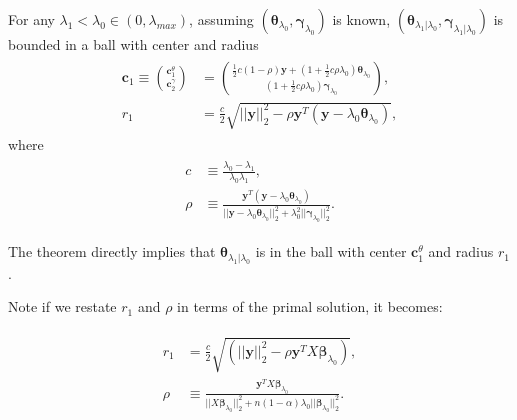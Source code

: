 \begin{theorem}
    \label{thm:1.1.alt}
    For any $\lambda_1<\lambda_{0}\in (0,\lambda_{max})$, assuming $(\boldsymbol\theta_{\lambda_0},\boldsymbol\gamma_{\lambda_0})$ is known, $(\boldsymbol\theta_{\lambda_1|\lambda_0},\boldsymbol\gamma_{\lambda_1|\lambda_0})$ is bounded in a ball with center and radius
    \begin{gather}
        \begin{aligned}
            \boldsymbol c_1\equiv\binom{\boldsymbol c_1^\theta}{\boldsymbol c_2^\gamma}&=\binom{\frac{1}{2}c(1-\rho)\boldsymbol y+(1+\frac{1}{2}c\rho\lambda_0)\boldsymbol\theta_{\lambda_0}}{(1+\frac{1}{2}c\rho\lambda_0)\boldsymbol\gamma_{\lambda_0}},\\
            r_1&=\frac{c}{2}\sqrt{||\boldsymbol y||_2^2-\rho \boldsymbol y^T(\boldsymbol y-\lambda_0\boldsymbol\theta_{\lambda_0})},
        \end{aligned}
    \end{gather}
    where
    \begin{gather}
        \begin{aligned}
            c&\equiv\frac{\lambda_0-\lambda_1}{\lambda_0\lambda_1},\\
            \rho&\equiv\frac{\boldsymbol y^T(\boldsymbol y-\lambda_0\boldsymbol\theta_{\lambda_0})}{||\boldsymbol y-\lambda_0\boldsymbol\theta_{\lambda_0}||_2^2+\lambda_0^2||\boldsymbol\gamma_{\lambda_0}||_2^2}.\nonumber
        \end{aligned}
    \end{gather}
\end{theorem}

The theorem  directly implies that $\boldsymbol\theta_{\lambda_1|\lambda_0}$ is in the ball with center $\boldsymbol c_1^\theta$ and radius $r_1$.

Note if we restate $r_1$ and $\rho$ in terms of the primal solution, it becomes:

\begin{gather}
    \label{eq:thm1prim}
    \begin{aligned}
        r_1&=\frac{c}{2}\sqrt{(||\boldsymbol y||_2^2-\rho \boldsymbol y^TX\boldsymbol\beta_{\lambda_0})},\\
        \rho&\equiv\frac{\boldsymbol y^TX\boldsymbol\beta_{\lambda_0}}{||X\boldsymbol\beta_{\lambda_0}||_2^2+n(1-\alpha)\lambda_0||\boldsymbol\beta_{\lambda_0}||_2^2}.
    \end{aligned}
\end{gather}

